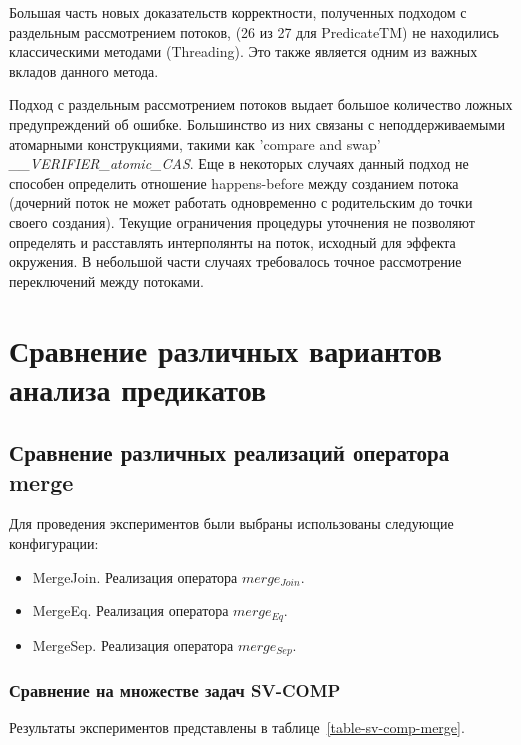 Большая часть новых доказательств корректности, полученных подходом с раздельным рассмотрением потоков, (26 из 27 для PredicateTM) не находились классическими методами (Threading). Это также является одним из важных вкладов данного метода.

Подход с раздельным рассмотрением потоков выдает большое количество ложных предупреждений об ошибке. 
Большинство из них связаны с неподдерживаемыми атомарными конструкциями, такими как 'compare and swap' {\em \_\_VERIFIER\_atomic\_CAS}.
Еще в некоторых случаях данный подход не способен определить отношение happens-before между созданием потока (дочерний поток не может работать одновременно с родительским до точки своего создания).
Текущие ограничения процедуры уточнения не позволяют определять и расставлять интерполянты на поток, исходный для эффекта окружения.
В небольшой части случаях требовалось точное рассмотрение переключений между потоками.

\section{Сравнение различных вариантов анализа предикатов}

\subsection{Сравнение различных реализаций оператора merge}

Для проведения экспериментов были выбраны использованы следующие конфигурации:

\begin{itemize}
\item MergeJoin. Реализация оператора $merge_{Join}$.
\item MergeEq. Реализация оператора $merge_{Eq}$.
\item MergeSep. Реализация оператора $merge_{Sep}$.
\end{itemize}

\subsubsection{Сравнение на множестве задач SV-COMP}

Результаты экспериментов представлены в таблице~\ref{table-sv-comp-merge}.

